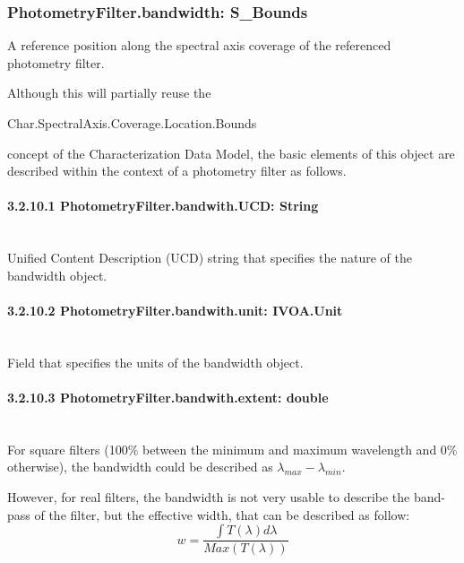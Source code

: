 \documentclass[11pt,a4paper]{ivoa}
\begin{document}
\subsubsection{PhotometryFilter.bandwidth: S\_Bounds}
A reference position along the spectral axis coverage of the referenced photometry filter.
\par

Although this will partially reuse the
\par

\begin{center}
Char.SpectralAxis.Coverage.Location.Bounds
\end{center}\par

concept of the Characterization Data Model, the basic elements of this object are described 
within the context of a photometry filter as follows.
\par

\paragraph{3.2.10.1
PhotometryFilter.bandwith.UCD: String} \hspace{0pt} \\
Unified Content Description (UCD) string that specifies the nature of the bandwidth object.
\par

\paragraph{3.2.10.2
PhotometryFilter.bandwith.unit: IVOA.Unit} \hspace{0pt} \\
Field that specifies the units of the bandwidth object.
\par

\paragraph{3.2.10.3
PhotometryFilter.bandwith.extent: double} \hspace{0pt} \\
For square filters (100$\%$  between the minimum and maximum wavelength and 0$\%$  otherwise), 
the bandwidth could be described as $\lambda_{max} - \lambda_{min}$.
\par

However, for real filters, the bandwidth is not very usable to describe the band-pass of the 
filter, but the effective width, that can be described as follow:
\begin{equation} \label{eq:21}
w = \frac{\int T(\lambda)d\lambda}{Max(T(\lambda))}
\end{equation}
\end{document}
